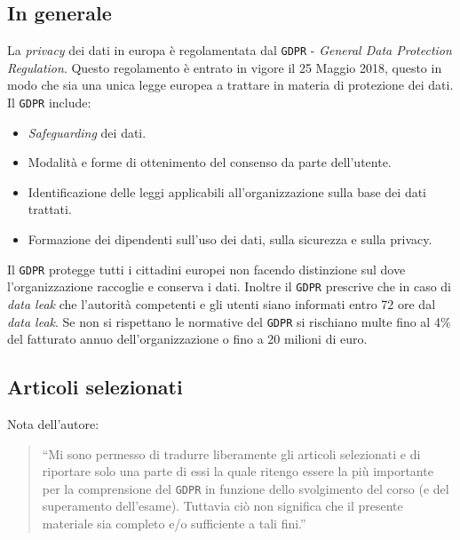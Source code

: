     \subsection{In generale}
        La \textit{privacy} dei dati in europa è regolamentata dal \texttt{GDPR} - \textit{General Data Protection Regulation}. Questo regolamento è entrato in vigore il 25 Maggio 2018, questo in modo che sia una unica legge europea a trattare in materia di protezione dei dati. Il \texttt{GDPR} include: \begin{itemize}
            \item \textit{Safeguarding} dei dati.
            \item Modalità e forme di ottenimento del consenso da parte dell'utente.
            \item Identificazione delle leggi applicabili all'organizzazione sulla base dei dati trattati.
            \item Formazione dei dipendenti sull'uso dei dati, sulla sicurezza e sulla privacy.
        \end{itemize}
        Il \texttt{GDPR} protegge tutti i cittadini europei non facendo distinzione sul dove l'organizzazione raccoglie e conserva i dati. Inoltre il \texttt{GDPR} prescrive che in caso di \textit{data leak} che l'autorità competenti e gli utenti siano informati entro 72 ore dal \textit{data leak}. Se non si rispettano le normative del \texttt{GDPR} si rischiano multe fino al 4\% del fatturato annuo dell'organizzazione o fino a 20 milioni di euro.
    \subsection{Articoli selezionati}
        Nota dell'autore: \begin{quote}``Mi sono permesso di tradurre liberamente gli articoli selezionati e di riportare solo una parte di essi la quale ritengo essere la più importante per la comprensione del \texttt{GDPR} in funzione dello svolgimento del corso (e del superamento dell'esame). Tuttavia ciò non significa che il presente materiale sia completo e/o sufficiente a tali fini.''\end{quote}
